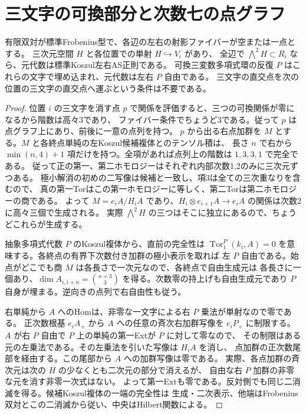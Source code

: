 \section{三文字の可換部分と次数七の点グラフ}
\label{sec:septic-point-curves}
\begin{proposition}\label{prop:commuting-three-point-graph}
有限双対が標準Frobenius型で、各辺の左右の射影ファイバーが空または一点とする。
三次元空間 $H$ と各位置での単射 $H\hookrightarrow V_i$ があり、
全辺で $\bigwedge^2 H\subset R_i$ なら、元代数は標準Koszul左右AS正則である。
可換三変数多項式環の反復 $P$ はこれらの文字で埋め込まれ、元代数は左右 $P$ 自由である。
三文字の直交点を次の位置の三文字の直交点へ運ぶという条件は不要である。
\end{proposition}
\begin{proof}
位置 $i$ の三文字を消す点 $p$ で関係を評価すると、三つの可換関係が零になるから階数は高々3であり、
ファイバー条件でちょうど3である。従って $p$ は点グラフ上にあり、前後に一意の点列を持つ。
$p$ から出る右点加群を $M$ とする。$M$ と各終点単純の左Koszul候補複体とのテンソル積は、
長さ $n$ で右から $\min(n,4)+1$ 項だけを持つ。全項があれば点列上の階数は $1,3,3,1$ で完全である。
従って正の第一、第二ホモロジーはそれぞれ内部次数1,2のみに三次元ずつある。
極小解消の初めの二写像は候補と一致し、項3は全ての三次重なりを含むので、
真の第一Torはこの第一ホモロジーに等しく、第二Torは第二ホモロジーの商である。
よって $M=e_iA/H_iA$ であり、$H_i\otimes e_{i+1}A\to e_iA$ の関係は次数2に高々三個で生成される。
実際 $\bigwedge^2H$ の三つはそこに独立にあるので、ちょうどこれらが生成する。

抽象多項式代数 $P$ のKoszul複体から、直前の完全性は
$\operatorname{Tor}^P_1(k_i,A)=0$ を意味する。各終点の有界下次数付き加群の極小表示を取れば
左 $P$ 自由である。始点がどこでも商 $M$ は各長さで一次元なので、各終点で自由生成元は
各長さに一個あり、$\dim A_{i,i+n}=\binom{n+3}{3}$ を得る。次数零の持上げも自由生成元であり
$P$ 自身が埋まる。逆向きの点列で右自由性も従う。

右単純から $A$ へのHomは、非零な一文字による右 $P$ 乗法が単射なので零である。
正次数根基 $e_iA_+$ から $A$ への任意の斉次右加群写像を $e_iP_+$ に制限する。
$A$ が右 $P$ 自由で $P$ 上の単純の第一Extが $P$ に対して零なので、
その制限はある元の左乗法である。その左乗法を引いた写像は $H_i A$ を消し、
点加群の正次数尾部を経由する。この尾部から $A$ への加群写像は零である。
実際、各点加群の斉次元は次の $H$ の少なくとも二次元の部分で消えるが、
自由な右 $P$ 加群の非零な元を消す非零一次式はない。
よって第一Extも零である。反対側でも同じ二消滅を得る。候補Koszul複体の一端の完全性は
生成・二次表示、他端はFrobenius双対とこの二消滅から従い、中央はHilbert関数による。
\end{proof}

